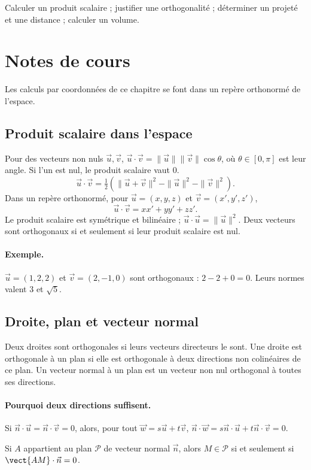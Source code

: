 \label{ch:11}


\begin{keypoint}[Objectifs]Calculer un produit scalaire ; justifier une orthogonalité ; déterminer un projeté et une distance ; calculer un volume.\end{keypoint}

\section{Notes de cours}
Les calculs par coordonnées de ce chapitre se font dans un repère orthonormé de l'espace.
\subsection{Produit scalaire dans l'espace}
Pour des vecteurs non nuls $\vec u,\vec v$, $\vec u\cdot\vec v=\|\vec u\|\|\vec v\|\cos\theta$, où $\theta\in[0,\pi]$ est leur angle. Si l'un est nul, le produit scalaire vaut $0$.
\[\vec u\cdot\vec v=\tfrac12(\|\vec u+\vec v\|^2-\|\vec u\|^2-\|\vec v\|^2).
\]
Dans un repère orthonormé, pour $\vec u=(x,y,z)$ et $\vec v=(x',y',z')$,
\[\vec u\cdot\vec v=xx'+yy'+zz'.\]
Le produit scalaire est symétrique et bilinéaire ; $\vec u\cdot\vec u=\|\vec u\|^2$. Deux vecteurs sont orthogonaux si et seulement si leur produit scalaire est nul.
\paragraph{Exemple.} $\vec u=(1,2,2)$ et $\vec v=(2,-1,0)$ sont orthogonaux : $2-2+0=0$. Leurs normes valent $3$ et $\sqrt5$.
\subsection{Droite, plan et vecteur normal}
Deux droites sont orthogonales si leurs vecteurs directeurs le sont. Une droite est orthogonale à un plan si elle est orthogonale à deux directions non colinéaires de ce plan. Un vecteur normal à un plan est un vecteur non nul orthogonal à toutes ses directions.
\paragraph{Pourquoi deux directions suffisent.} Si $\vec n\cdot\vec u=\vec n\cdot\vec v=0$, alors, pour tout $\vec w=s\vec u+t\vec v$, $\vec n\cdot\vec w=s\vec n\cdot\vec u+t\vec n\cdot\vec v=0$.
\begin{keypoint}
Si $A$ appartient au plan $\mathcal P$ de vecteur normal $\vec n$, alors $M\in\mathcal P$ si et seulement si $\vect{AM}\cdot\vec n=0$.
\end{keypoint}
